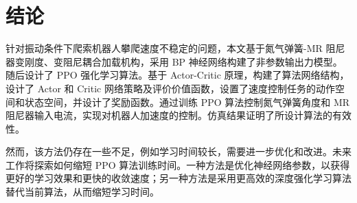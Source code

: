 \documentclass[12pt,a4paper]{ctexart}
\begin{document}
\section{结论}
针对振动条件下爬索机器人攀爬速度不稳定的问题，本文基于氮气弹簧-MR 阻尼器变刚度、变阻尼耦合加载机构，采用 BP 神经网络构建了非参数输出力模型。随后设计了 PPO 强化学习算法。基于 Actor-Critic 原理，构建了算法网络结构，设计了 Actor 和 Critic 网络策略及评价价值函数，设置了速度控制任务的动作空间和状态空间，并设计了奖励函数。通过训练 PPO 算法控制氮气弹簧角度和 MR 阻尼器输入电流，实现对机器人加速度的控制。仿真结果证明了所设计算法的有效性。

然而，该方法仍存在一些不足，例如学习时间较长，需要进一步优化和改进。未来工作将探索如何缩短 PPO 算法训练时间。一种方法是优化神经网络参数，以获得更好的学习效果和更快的收敛速度；另一种方法是采用更高效的深度强化学习算法替代当前算法，从而缩短学习时间。
\end{document}
